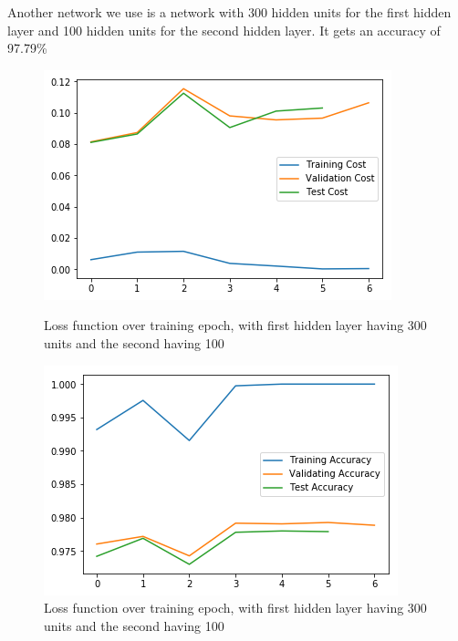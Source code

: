 \documentclass{article}
\begin{document}
Another network we use is a network with 300 hidden units for the first hidden layer and 100 hidden units for the second hidden layer. It gets an accuracy of 97.79\%
\begin{figure}[h]
	\begin{minipage}{0.48\textwidth}
	\centering
	\includegraphics[width=\textwidth]{pics/loss_300_100.png}
	\caption{Loss function over training epoch, with first hidden layer having 300 units and the second having 100}
	\end{minipage}\hfill
	\begin{minipage}{0.48\textwidth}
	\centering
	\includegraphics[width=\textwidth]{pics/acc_300_100.png}
	\caption{Loss function over training epoch, with first hidden layer having 300 units and the second having 100}
	\end{minipage}
\end{figure}
\end{document}
